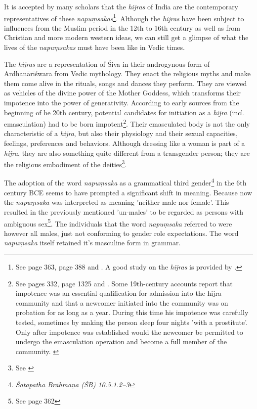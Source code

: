 It is accepted by many scholars that the {\em hijras} of India are the contemporary representatives of these {\em napuṃsakas}\footnote{See \cite{zwilling} page 363, \cite{goldman} page 388 and \cite{wendy}. A good study on the {\em hijras} is provided by \cite{nanda}.}. Although the {\em hijras} have been subject to influences from the Muslim period in the 12th to 16th century as well as from Christian and more modern western ideas, we can still get a glimpse of what the lives of the {\em napuṃsakas} must have been like in Vedic times. 

The {\em hijras} are a representation of Śiva in their androgynous form of Ardhanārīśwara from Vedic mythology. They enact the religious myths and make them come alive in the rituals, songs and dances they perform. They are viewed as vehicles of the divine power of the Mother Goddess, which transforms their impotence into the power of generativity. According to early sources from the beginning of he 20th century, potential candidates for initiation as a {\em hijra} (incl. emasculation) had to be born impotent\footnote{See \cite{ibbetson} pages 332, \cite{shah} page 1325 and \cite{bhimbhai}. Some 19th-century accounts report that impotence was an essential qualification for admission into the hijra community and that a newcomer initiated into the community was on probation for as long as a year. During this time his impotence was carefully tested, sometimes by making the person sleep four nights 'with a prostitute'. Only after impotence was established would the newcomer be permitted to undergo the emasculation operation and become a full member of the community. \cite{preston}}. Their emasculated body is not the only characteristic of a {\em hijra}, but also their physiology and their sexual capacities, feelings, preferences and behaviors. Although dressing like a woman is part of a {\em hijra}, they are also something quite different from a transgender person; they are the religious embodiment of the deities\footnote{See \cite{nanda}}.

The adoption of the word {\em napuṃsaka} as a grammatical third gender\footnote{{\em Śatapatha Brāhmaṇa (ŚB) 10.5.1.2–3}} in the 6th century BCE seems to have prompted a significant shift in meaning. Because now the {\em napuṃsaka} was interpreted as meaning 'neither male nor female'. This resulted in the previously mentioned 'un-males' to be regarded as persons with ambiguous sex\footnote{See \cite{zwilling2000} page 362}. The individuals that the word {\em napuṃsaka} referred to were however all males, just not conforming to gender role expectations. The word {\em napuṃsaka} itself retained it's masculine form in grammar.

